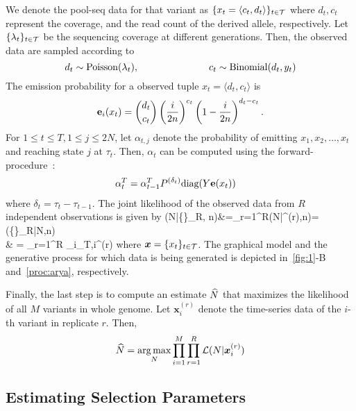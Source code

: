 We denote the pool-seq data for that variant as $\{x_t = \langle
c_t,d_t \rangle\}_{t\in{\cal T}}$ where $d_t, c_t$ represent the coverage,
and the read count of the derived allele, respectively. Let
$\{\lambda_t\}_{t\in{\cal T}}$ be the sequencing coverage at different
generations. Then, the observed data are sampled according to
\begin{equation} d_t \sim \operatorname{Poisson}(\lambda_t), \hspace{1in} c_t \sim
\operatorname{Binomial}(d_t,y_t) 
\end{equation}
The emission probability for a observed tuple $x_t=\langle d_t,
c_t\rangle $ is 
\begin{equation} {\bf e}_{i}(x_t) = {d_t \choose c_t}
\left(\frac{i}{2n} \right)^{c_t}\left (1- \frac{i}{2n}
\right)^{d_t-c_t} .  
\end{equation}
For $1\le t\le T, 1\le j\le 2N$, let $\alpha_{t,j}$ denote the
probability of emitting $x_1,x_2,\ldots,x_t$ and reaching state $j$ at
$\tau_t$. Then, $\alpha_{t}$ can be computed using the
forward-procedure~\cite{durbin1998biological}:
\begin{align}
	\alpha_t^T&=\alpha_{t-1}^T P^{(\delta_t)}\text{diag}(Y{\mathbf e}(x_t))
	\label{eq:hmm}
\end{align}
where $\delta_t=\tau_t-\tau_{t-1}$. The joint likelihood of the
observed data from $R$ independent observations is given by
\beq
\Lc(N|\{\}_R, 
n)&=\prod_{r=1}^R\Lc(N|^{(r)},n)=\pr(\{\}_R|N,n)\\& =	
	\prod_{r=1}^R \sum_i\alpha_{T,i}^{(r)}
	\label{eq:hmmlik}
\eeq
where $\bm{x}=\{x_t\}_{t\in {\cal T}}$. The graphical model and the generative 
process for which data is being generated is depicted in~\ref{fig:1}-B 
and~\ref{proc:arya}, respectively.

Finally, the last step is to compute an estimate $\widehat{N}$ that maximizes
the likelihood of all $M$ variants in whole genome. Let
$\bm{x}_i^{(r)}$ denote the time-series data of the $i$-th variant in
replicate $r$. Then,
\begin{equation}
 \widehat{N} =
\underset{N}{\arg \max} \prod_{i=1}^M  \prod_{r=1}^R{\cal L}(N|\bm{x}_i^{(r)})
\label{eq:mlen}
\end{equation}

\subsection{Estimating Selection Parameters}

